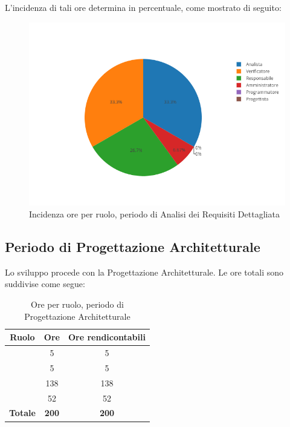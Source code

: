 L'incidenza di tali ore determina in percentuale, come mostrato di seguito:
\begin{figure}[H]
	\centering
	\includegraphics[scale=0.6]{img/AnalisiRequisitiDettaglio.png}
	\caption{Incidenza ore per ruolo, periodo di Analisi dei Requisiti Dettagliata}
\end{figure}

\newpage
\subsection{Periodo di Progettazione Architetturale}
Lo sviluppo procede con la Progettazione Architetturale. Le ore totali sono suddivise come segue:

\begin{table}[H]
	\begin{center}
		\begin{tabular}{|c|c|c|}
			\hline
			\textbf{Ruolo}	& \textbf{Ore}	& \textbf{Ore rendicontabili} \\
			\hline
			\Res	&	5	&	5	\\
			\hline
			\Amm	&	5	&	5	\\
			\hline
			\Prog   &	138   &	138	\\
			\hline
			\Ver	&	52	&	52	\\
			\hline
			\textbf{Totale} & \textbf{200} & \textbf{200} \\
			\hline
		\end{tabular}
	\end{center}
	\caption{Ore per ruolo, periodo di Progettazione Architetturale}
\end{table}

